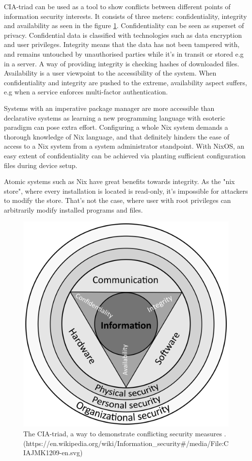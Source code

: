 CIA-triad can be used as a tool to show conflicts between different points of information security interests. It consists of three meters: confidentiality, integrity and availability as seen in the figure \ref{ciatriad}. Confidentiality can be seen as superset of privacy. Confidential data is classified with technologies such as data encryption and user privileges. Integrity means that the data has not been tampered with, and remains untouched by unauthorised parties while it's in transit or stored e.g in a server. A way of providing integrity is checking hashes of downloaded files. Availability is a user viewpoint to the accessibility of the system. When confidentiality and integrity are pushed to the extreme, availability aspect suffers, e.g when a service enforces multi-factor authentication. \cite{pender2019parkerian}

Systems with an imperative package manager are more accessible than declarative systems as learning a new programming language with esoteric paradigm can pose extra effort. Configuring a whole Nix system demands a thorough knowledge of Nix language, and that definitely hinders the ease of access to a Nix system from a system administrator standpoint. With NixOS, an easy extent of confidentiality can be achieved via planting sufficient configuration files during device setup.

Atomic systems such as Nix have great benefits towards integrity. As the "nix store", where every installation is located is read-only, it's impossible for attackers to modify the store. That's not the case, where user with root privileges can arbitrarily modify installed programs and files.
\begin{figure}
    \centering
    \includegraphics[scale=0.2]{latex/kuvat/ciatriad.png}
    \caption{The CIA-triad, a way to demonstrate conflicting security measures \cite{hughes2013quantitative}. (https://en.wikipedia.org/wiki/Information_security#/media/File:CIAJMK1209-en.svg)}
    \label{ciatriad}
\end{figure}
